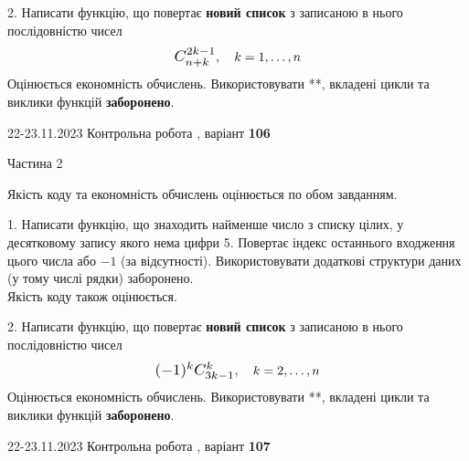 \documentclass[12pt, ukrainian]{article}
\begin{document}
{{{{{\begin {Large}
\vspace{10mm}



2. 
Написати функцію, що повертає \textbf{новий список} з записаною в нього послідовністю чисел
$$\scalebox{1.2}{$C_{n+k}^{2k-1}$}, \quad k=1,\ldots,n$$
Оцінюється економність обчислень. Використовувати **, вкладені цикли та виклики функцій \textbf{заборонено}.

\end{Large}\newpage




\begin {Huge}
{{22-23.11.2023 Контрольна робота , варіант  \No \textbf { 106 }\par}}

\begin{center}Частина 2
\end{center}
\vspace{10mm}
\end {Huge}

{
\begin {Large}
Якість коду та економність обчислень оцінюється по обом завданням.

\vspace{5mm}

1. Написати функцію, що знаходить найменше число з списку цілих, у десятковому запису якого нема цифри 5. Повертає індекс останнього входження цього числа або $-1$ (за відсутності). Використовувати додаткові структури даних (у тому числі рядки) заборонено.\\	Якість коду також оцінюється. 



\vspace{10mm}



2. 
Написати функцію, що повертає \textbf{новий список} з записаною в нього послідовністю чисел
$$\scalebox{1.2}{$(-1)^{k}C_{3k-1}^{k}$}, \quad k=2,\ldots,n$$
Оцінюється економність обчислень. Використовувати **, вкладені цикли та виклики функцій \textbf{заборонено}.

\end{Large}\newpage




\begin {Huge}
{{22-23.11.2023 Контрольна робота , варіант  \No \textbf { 107 }\par}}


\end{Huge}}}}}}}
\end{document}
